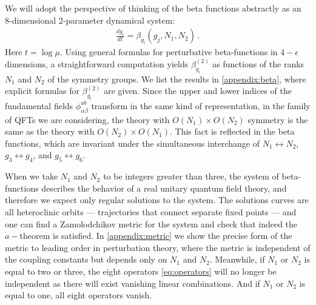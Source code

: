 We will adopt the perspective of thinking of the beta functions abstractly as an 8-dimensional 2-parameter dynamical system:
\begin{align}
\label{eq:fullsystem}
\frac{dg_i}{dt}=\beta_{g_i}(g_j,N_1,N_2)\,.
\end{align}
Here $t=\log\mu$. Using general formulas for perturbative beta-functions in $4-\epsilon$ dimensions, a straightforward computation yields $\beta_{g_i}^{(2)}$ as functions of the ranks $N_1$ and $N_2$ of the symmetry groups. We list the results in \cref{appendix:beta}, where explicit formulas for $\beta_{g_i}^{(2)}$ are given. Since the upper and lower indices of the fundamental fields $\phi^{ab}_{\alpha\beta}$ transform in the same kind of representation, in the family of QFTs we are considering, the theory with $O(N_1)\times O(N_2)$ symmetry is the same as the theory with $O(N_2)\times O(N_1)$. This fact is reflected in the beta functions, which are invariant under the simultaneous interchange of $N_1\leftrightarrow N_2$, $g_3\leftrightarrow g_4$, and $g_5 \leftrightarrow g_6$.

When we take $N_1$ and $N_2$ to be integers greater than three, the system of beta-functions describes the behavior of a real unitary quantum field theory, and therefore we expect only regular solutions to the system. The solutions curves are all heteroclinic orbits --- trajectories that connect separate fixed points --- and one can find a Zamolodchikov metric for the system and check that indeed the $a-$theorem is satisfied. In \cref{appendix:metric} we show the precise form of the metric to leading order in perturbation theory, where the metric is independent of the coupling constants but depends only on $N_1$ and $N_2$. Meanwhile, if $N_1$ or $N_2$ is equal to two or three, the eight operators \cref{eq:operators} will no longer be independent as there will exist vanishing linear combinations. And if $N_1$ or $N_2$ is equal to one, all eight operators vanish.

